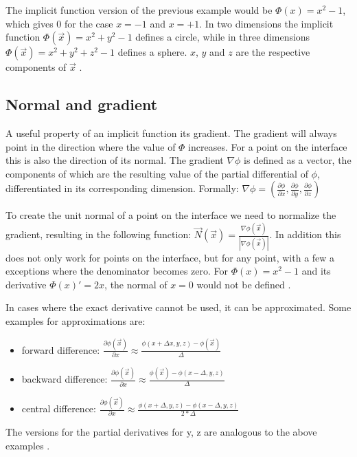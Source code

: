 The implicit function version of the previous example would be $\Phi(x) = x^2 - 1$, which gives 0 for the case $x = -1$ and $x = +1$.
In two dimensions the implicit function $\Phi(\vec{x}) = x^2 + y^2 - 1$ defines a circle, while in three dimensions  $\Phi(\vec{x}) = x^2 + y^2 + z^2 - 1$ defines a sphere. $x$, $y$ and $z$ are the respective components of $\vec{x}$ \cite{osher:2006:level}.

\subsection{Normal and gradient}

A useful property of an implicit function its gradient. The gradient will always point in the direction where the value of $\Phi$ increases. For a point on the interface this is also the direction of its normal. The gradient $\nabla\phi$ is defined as a vector, the components of which are the resulting value of the partial differential of $\phi$, differentiated in its corresponding dimension\cite{osher:2006:level}. Formally: $\nabla\phi = (\frac{\partial\phi}{\partial x},\frac{\partial\phi}{\partial y},\frac{\partial\phi}{\partial z})$ 

To create the unit normal of a point on the interface we need to normalize the gradient, resulting in the following function: $\vec{N}(\vec{x}) = \frac{\nabla\phi(\vec{x})}{|\nabla\phi(\vec{x})|}$. In addition this does not only work for points on the interface, but for any point, with a few a exceptions where the denominator becomes zero. For $\Phi(x) = x^2 - 1$ and its derivative $\Phi(x)' = 2x$, the normal of $x = 0$ would not be defined \cite{osher:2006:level}.

In cases where the exact derivative cannot be used, it can be approximated. Some examples for approximations are:
\begin{itemize}
	\item forward difference:  $\frac{\partial\phi(\vec{x})}{\partial x} \approx \frac{\phi(x+\Delta x, y, z) - \phi(\vec{x})}{\Delta}$
	\item backward difference: $\frac{\partial\phi(\vec{x})}{\partial x} \approx \frac{\phi(\vec{x}) - \phi(x-\Delta, y, z)}{\Delta}$
	\item central difference: $\frac{\partial\phi(\vec{x})}{\partial x} \approx \frac{\phi(x+\Delta, y, z) - \phi(x-\Delta, y, z)}{2*\Delta}$
\end{itemize}

The versions for the partial derivatives for y, z are analogous to the above examples \cite{osher:2006:level}.


